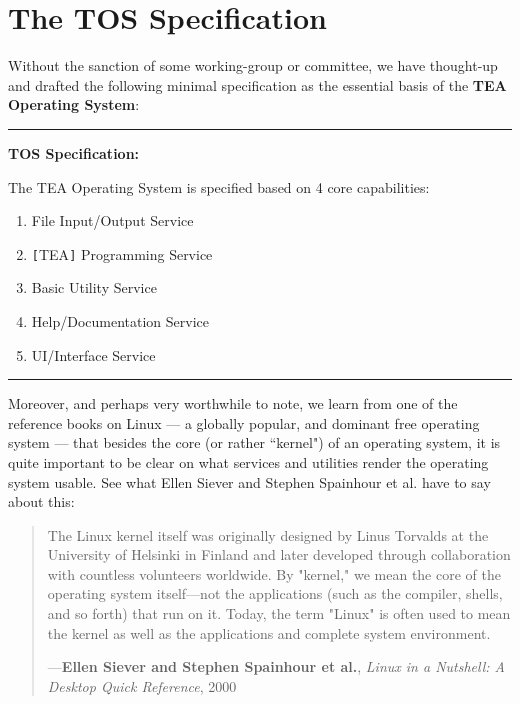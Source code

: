 \documentclass{article}
\begin{document}
\section{The TOS Specification}
\label{SECTOSSPEC}

Without the sanction of some working-group or committee, we have thought-up and drafted the following minimal specification as the essential basis of the \textbf{TEA Operating System}:

\noindent\rule{\textwidth}{0.4pt}

\textbf{TOS Specification:}

The TEA Operating System is specified based on 4 core capabilities:

\begin{enumerate}
\item File Input/Output Service
\item \verb$[$TEA\verb$]$ Programming Service
\item Basic Utility Service
\item Help/Documentation Service
\item UI/Interface Service
\end{enumerate}


\noindent\rule{\textwidth}{0.4pt}


Moreover, and perhaps very worthwhile to note, we learn from one of the reference books on Linux --- a globally popular, and dominant free operating system --- that besides the core (or rather ``kernel") of an operating system, it is quite important to be clear on what services and utilities render the operating system usable. See what Ellen Siever and Stephen Spainhour et al. have to say about this:


\noindent
\begin{minipage}{1\textwidth}
\vspace{2em}
\begin{quotation}
{\ttfamily 

The Linux kernel itself was originally designed by Linus Torvalds at the University of Helsinki in Finland and later developed through collaboration with countless volunteers worldwide. By "kernel," we mean the core of the operating system itself---not the applications (such as the compiler, shells, and so forth) that run on it. Today, the term "Linux" is often used to mean the kernel as well as the applications and complete system environment.

}
\hspace*{\fill} ---\textbf{Ellen Siever and Stephen Spainhour et al.}, \textit{Linux in a Nutshell: A Desktop Quick Reference}, 2000\cite{Siever2000LinuxNutshell}
\end{quotation}
\vspace{2em}
\end{minipage}
\end{document}
